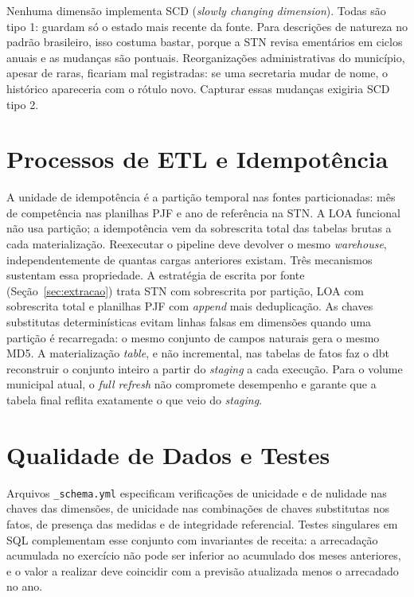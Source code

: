 Nenhuma dimensão implementa SCD (\textit{slowly changing dimension}). Todas são tipo 1: guardam só o estado mais recente da fonte. Para descrições de natureza no padrão brasileiro, isso costuma bastar, porque a STN revisa ementários em ciclos anuais e as mudanças são pontuais. Reorganizações administrativas do município, apesar de raras, ficariam mal registradas: se uma secretaria mudar de nome, o histórico apareceria com o rótulo novo. Capturar essas mudanças exigiria SCD tipo 2.

\section{Processos de ETL e Idempotência}

A unidade de idempotência é a partição temporal nas fontes particionadas: mês de competência nas planilhas PJF e ano de referência na STN. A LOA funcional não usa partição; a idempotência vem da sobrescrita total das tabelas brutas a cada materialização. Reexecutar o pipeline deve devolver o mesmo \textit{warehouse}, independentemente de quantas cargas anteriores existam. Três mecanismos sustentam essa propriedade. A estratégia de escrita por fonte (Seção~\ref{sec:extracao}) trata STN com sobrescrita por partição, LOA com sobrescrita total e planilhas PJF com \textit{append} mais deduplicação. As chaves substitutas determinísticas evitam linhas falsas em dimensões quando uma partição é recarregada: o mesmo conjunto de campos naturais gera o mesmo MD5. A materialização \textit{table}, e não incremental, nas tabelas de fatos faz o dbt reconstruir o conjunto inteiro a partir do \textit{staging} a cada execução. Para o volume municipal atual, o \textit{full refresh} não compromete desempenho e garante que a tabela final reflita exatamente o que veio do \textit{staging}.

\section{Qualidade de Dados e Testes}

Arquivos \texttt{\_schema.yml} especificam verificações de unicidade e de nulidade nas chaves das dimensões, de unicidade nas combinações de chaves substitutas nos fatos, de presença das medidas e de integridade referencial. Testes singulares em SQL complementam esse conjunto com invariantes de receita: a arrecadação acumulada no exercício não pode ser inferior ao acumulado dos meses anteriores, e o valor a realizar deve coincidir com a previsão atualizada menos o arrecadado no ano.

